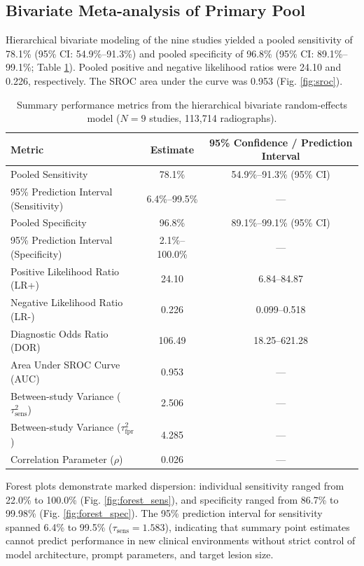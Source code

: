 \documentclass[preprint,11pt]{elsarticle}
\begin{document}
\subsection{Bivariate Meta-analysis of Primary Pool}
Hierarchical bivariate modeling of the nine studies yielded a pooled sensitivity of 78.1\% (95\% CI: 54.9\%--91.3\%) and pooled specificity of 96.8\% (95\% CI: 89.1\%--99.1\%; Table \ref{tab:pooled}). Pooled positive and negative likelihood ratios were 24.10 and 0.226, respectively. The SROC area under the curve was 0.953 (Fig. \ref{fig:sroc}).

\begin{table}[htbp]
\centering
\small
\caption{Summary performance metrics from the hierarchical bivariate random-effects model ($N=9$ studies, 113,714 radiographs).}
\label{tab:pooled}
\begin{tabular}{l c c}
\toprule
\textbf{Metric} & \textbf{Estimate} & \textbf{95\% Confidence / Prediction Interval} \\
\midrule
Pooled Sensitivity & 78.1\% & 54.9\%--91.3\% (95\% CI) \\
95\% Prediction Interval (Sensitivity) & 6.4\%--99.5\% & --- \\
Pooled Specificity & 96.8\% & 89.1\%--99.1\% (95\% CI) \\
95\% Prediction Interval (Specificity) & 2.1\%--100.0\% & --- \\
Positive Likelihood Ratio (LR+) & 24.10 & 6.84--84.87 \\
Negative Likelihood Ratio (LR-) & 0.226 & 0.099--0.518 \\
Diagnostic Odds Ratio (DOR) & 106.49 & 18.25--621.28 \\
Area Under SROC Curve (AUC) & 0.953 & --- \\
Between-study Variance ($\tau^2_{\text{sens}}$) & 2.506 & --- \\
Between-study Variance ($\tau^2_{\text{fpr}}$) & 4.285 & --- \\
Correlation Parameter ($\rho$) & 0.026 & --- \\
\bottomrule
\end{tabular}
\end{table}

Forest plots demonstrate marked dispersion: individual sensitivity ranged from 22.0\% to 100.0\% (Fig. \ref{fig:forest_sens}), and specificity ranged from 86.7\% to 99.98\% (Fig. \ref{fig:forest_spec}). The 95\% prediction interval for sensitivity spanned 6.4\% to 99.5\% ($\tau_{\text{sens}}=1.583$), indicating that summary point estimates cannot predict performance in new clinical environments without strict control of model architecture, prompt parameters, and target lesion size.
\end{document}
